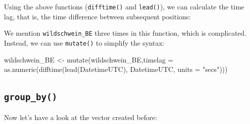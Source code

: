 \documentclass[
]{book}
\newenvironment{Shaded}{\begin{snugshade}}{\end{snugshade}}
\newcommand{\AttributeTok}[1]{\textcolor[rgb]{0.77,0.63,0.00}{#1}}
\newcommand{\DocumentationTok}[1]{\textcolor[rgb]{0.56,0.35,0.01}{\textbf{\textit{#1}}}}
\newcommand{\FunctionTok}[1]{\textcolor[rgb]{0.00,0.00,0.00}{#1}}
\newcommand{\NormalTok}[1]{#1}
\newcommand{\OtherTok}[1]{\textcolor[rgb]{0.56,0.35,0.01}{#1}}
\newcommand{\SpecialCharTok}[1]{\textcolor[rgb]{0.00,0.00,0.00}{#1}}
\newcommand{\StringTok}[1]{\textcolor[rgb]{0.31,0.60,0.02}{#1}}
\begin{document}
Using the above functions (\texttt{difftime()} and \texttt{lead()}), we can calculate the time lag, that is, the time difference between subsequent positions:

\begin{Shaded}
\end{Shaded}

We mention \texttt{wildschwein\_BE} three times in this function, which is complicated. Instead, we can use \texttt{mutate()} to simplify the syntax:

\begin{Shaded}
\begin{Highlighting}[]
\NormalTok{wildschwein\_BE }\OtherTok{\textless{}{-}} \FunctionTok{mutate}\NormalTok{(wildschwein\_BE,}\AttributeTok{timelag =} \FunctionTok{as.numeric}\NormalTok{(}\FunctionTok{difftime}\NormalTok{(}\FunctionTok{lead}\NormalTok{(DatetimeUTC),}
\NormalTok{                                                                      DatetimeUTC,}
                                                                      \AttributeTok{units =} \StringTok{"secs"}\NormalTok{)))}
\end{Highlighting}
\end{Shaded}

\hypertarget{group_by}{%
\subsection{\texorpdfstring{\texttt{group\_by()}}{group\_by()}}\label{group_by}}

Now let's have a look at the vector created before:

\begin{Shaded}
\end{Shaded}
\end{document}
